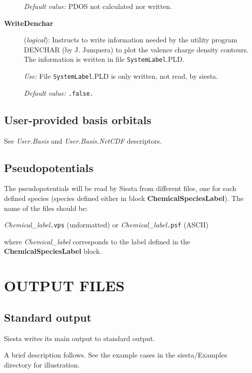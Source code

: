 \documentclass[11pt]{article}
\begin{document}
\begin{description}
{\it Default value:} PDOS not calculated nor written.

\item[{\bf WriteDenchar}] ({\it logical}):
Instructs to write information needed by the utility program
DENCHAR (by J. Junquera) to plot the valence charge density
contours. The information is written in file {\tt SystemLabel}.PLD.
 
{\it Use:} File {\tt SystemLabel}.PLD is only written, not read, by siesta.
 
{\it Default value:} {\tt .false.}

\end{description}
        

\subsection{User-provided basis orbitals}

See {\it User.Basis} and {\it User.Basis.NetCDF} descriptors.

\subsection{Pseudopotentials}

The pseudopotentials will be read by {\sc Siesta} from different files, one
for each defined species (species defined either in block
{\bf ChemicalSpeciesLabel}).
The name of the files should be:

{\it Chemical\_label}{\tt .vps} (unformatted) or
{\it Chemical\_label}{\tt .psf} (ASCII)

\noindent 
where {\it Chemical\_label} corresponds to the label defined in the
{\bf ChemicalSpeciesLabel} block.
        
\section{OUTPUT FILES}

\subsection{Standard output} 

{\sc Siesta} writes its main output to standard output. 

A brief description follows. See the example cases in the 
siesta/Examples directory for illustration. 
\end{document}
